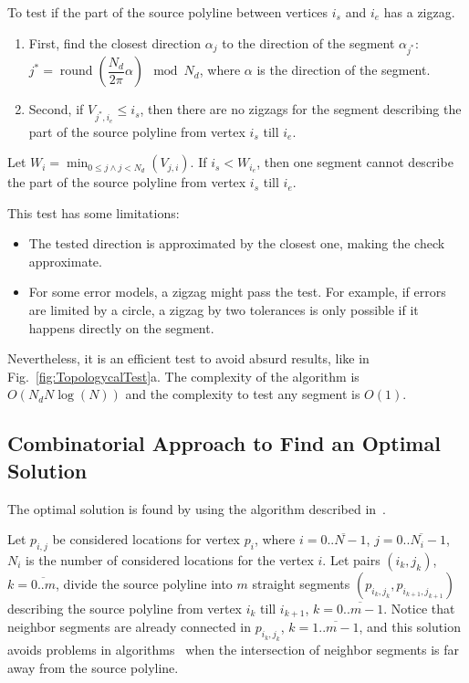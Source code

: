 \documentclass[conference]{IEEEtran}
\DeclareMathOperator{\round}{round}
\begin{document}
To test if the part of the source polyline between vertices $i_s$ and $i_e$ has a zigzag.
\begin{enumerate}[label={}]
  \item First, find the closest direction $\alpha_j$ to the direction of the segment $\alpha_{j^*}$:
  $
    j^* = \round{\left( \dfrac{N_d}{2 \pi} \alpha \right)}
    \!\!\!
    \mod
    N_d
  $,
  where $\alpha$ is the direction of the segment.
  \item Second, if $V_{j^*, i_{e}} \leq i_{s}$, then there are no zigzags for the segment describing the part of the source polyline from vertex $i_{s}$ till $i_{e}$.
\end{enumerate}

Let $W_i = \min_{0 \leq j \wedge j < N_d}{\left( V_{j, i} \right)}$. If $i_{s} < W_{i_{e}}$, then one segment cannot describe the part of the source polyline from vertex $i_{s}$ till $i_{e}$.

This test has some limitations:
\begin{itemize}
  \item The tested direction is approximated by the closest one, making the check approximate.
  \item For some error models, a zigzag might pass the test. For example, if errors are limited by a circle, a zigzag by two tolerances is only possible if it happens directly on the segment.
\end{itemize}

Nevertheless, it is an efficient test to avoid absurd results, like in Fig.~\ref{fig:TopologycalTest}a. The complexity of the algorithm is $O{\left( N_d N \log \left( N \right) \right)}$ and the complexity to test any segment is $O{\left( 1 \right)}$.

\subsection
{
  Combinatorial Approach to Find an Optimal Solution
  \label{sec:CombinatorialApproach}
}

The optimal solution is found by using the algorithm described in~\cite{PolylineGeneralizationCombinatorical}.

Let $p_{i, j}$ be considered locations for vertex $p_i$, where ${i = \overline{0..N - 1}}$, ${j = \overline{0..N_i - 1}}$, $N_i$ is the number of considered locations for the vertex $i$. Let pairs $\left( i_k, j_k \right)$, ${k = \overline{0..m}}$, divide the source polyline into $m$ straight segments
$
  \left( p_{i_k, j_k}, p_{i_{k + 1}, j_{k + 1}} \right)
$
describing the source polyline from vertex $i_k$ till $i_{k + 1}$, $k = \overline{0..m - 1}$. Notice that neighbor segments are already connected in $p_{i_k, j_k}$, $k = \overline{1..m - 1}$, and this solution avoids problems in algorithms~\cite{PolylineGeneralizationCombinatorical, PolylineGeneralization} when the intersection of neighbor segments is far away from the source polyline.
\end{document}
